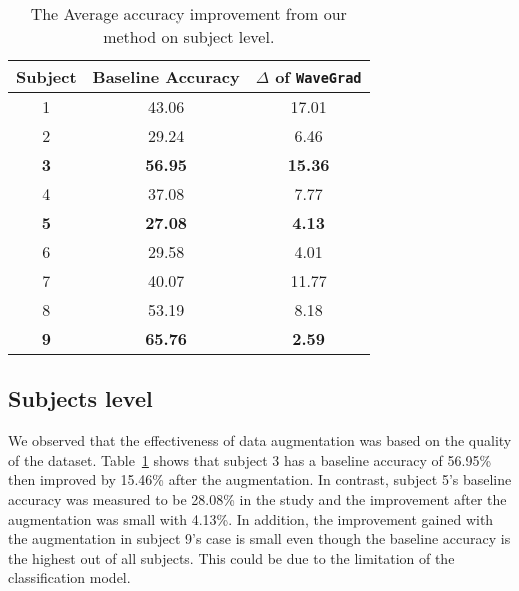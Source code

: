 \begin{table}[ht!]
    \centering
    \caption{The Average accuracy improvement from our method on subject level.}
    \label{tab:AccuracySubject}
    \begin{tabular}{ccc}
        \hline
        Subject & Baseline Accuracy & \begin{math} \Delta \end{math} of \texttt{WaveGrad} \\
        \hline
        1        & 43.06             & 17.01             \\
        2        & 29.24             & 6.46              \\
        \textbf{3}        & \textbf{56.95}            & \textbf{15.36}             \\
        4        & 37.08             & 7.77              \\
        \textbf{5}        & \textbf{27.08}             & \textbf{4.13}              \\
        6        & 29.58             & 4.01              \\
        7        & 40.07             & 11.77             \\
        8        & 53.19             & 8.18              \\
        \textbf{9}        & \textbf{65.76}             & \textbf{2.59}              \\
        \hline
        \end{tabular}
\end{table}

\subsection{Subjects level}
We observed that the effectiveness of data augmentation was based on the quality of the dataset.
Table~\ref{tab:AccuracySubject} shows that subject 3 has a baseline accuracy of 56.95\% then improved by 15.46\% after the augmentation.
In contrast, subject 5's baseline accuracy was measured to be 28.08\% in the study and the improvement after the augmentation was small with 4.13\%. 
In addition, the improvement gained with the augmentation in subject 9's case is small even though the baseline accuracy is the highest out of all subjects.
This could be due to the limitation of the classification model. 


